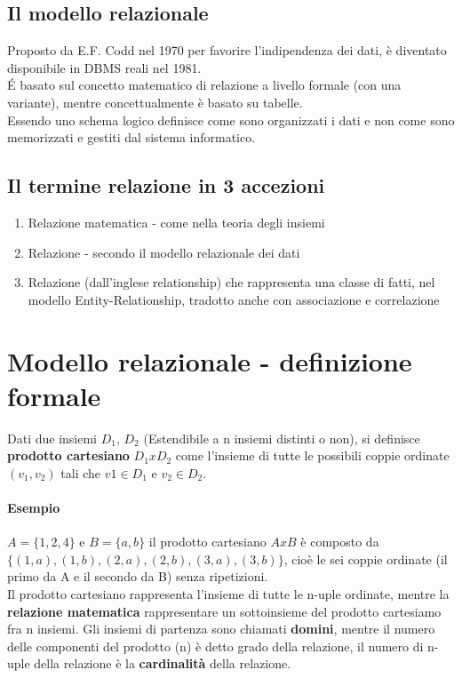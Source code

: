  \subsection{Il modello relazionale}
 Proposto da E.F. Codd nel 1970 per favorire l'indipendenza dei dati, è
 diventato disponibile in DBMS reali nel 1981.
 \\ \'E basato sul concetto matematico di relazione a livello formale (con una variante),
 mentre concettualmente è basato su tabelle.
 \\ Essendo uno schema logico definisce come sono organizzati i dati e non come
 sono memorizzati e gestiti dal sistema informatico.
 \subsection{Il termine relazione in 3 accezioni}
 \begin{enumerate}
    \item Relazione matematica - come nella teoria degli insiemi
    \item Relazione - secondo il modello relazionale dei dati
    \item Relazione (dall'inglese relationship) che rappresenta una classe di fatti,
    nel modello Entity-Relationship, tradotto anche con associazione e correlazione
 \end{enumerate}
 \section{Modello relazionale - definizione formale}
 Dati due insiemi $D_1, \,D_2$ (Estendibile a n insiemi distinti o non), si definisce
 \textbf{prodotto cartesiano} $D_1 x D_2$ come l'insieme di tutte le possibili coppie
 ordinate $(v_1, v_2)$ tali che $v1 \in D_1$ e $v_2 \in D_2$.
 \paragraph*{Esempio} $A=\{1,2,4\}$ e $B=\{a,b\}$ il prodotto cartesiano $AxB$ è
 composto da $\{(1,a), (1,b), (2,a), (2,b), (3,a), (3,b)\}$, cioè le sei coppie ordinate
 (il primo da A e il secondo da B) senza ripetizioni.
 \\ Il prodotto cartesiano rappresenta l'insieme di tutte le n-uple ordinate,
 mentre la \textbf{relazione matematica} rappresentare un sottoinsieme del prodotto
 cartesiamo fra n insiemi. Gli insiemi di partenza sono chiamati \textbf{domini},
 mentre il numero delle componenti del prodotto (n) è detto grado della relazione, 
 il numero di n-uple della relazione è la \textbf{cardinalità} della relazione.
 